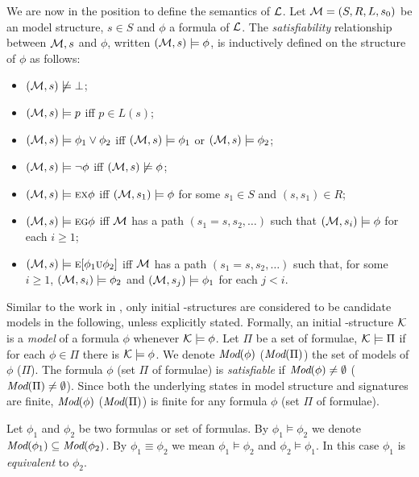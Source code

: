 \documentclass{article}
\begin{document}
We are now in the position to define the semantics of $\cal L$.
Let ${\cal M}=(S,R,L,s_0)$ be an model structure, $s\in S$ and $\phi$ a formula of $\cal L$.
The {\em satisfiability} relationship between ${\cal M},s$ and $\phi$,
written $({\cal M},s)\models\phi$, is inductively defined on the structure of $\phi$ as follows:
\begin{itemize}
  \item $({\cal M},s)\not\models\bot$;
  \item $({\cal M},s)\models p$ iff $p\in L(s)$;
  \item $({\cal M},s)\models \phi_1\lor\phi_2$ iff
    $({\cal M},s)\models \phi_1$ or $({\cal M},s)\models \phi_2$;
  \item $({\cal M},s)\models \neg\phi$ iff  $({\cal M},s)\not\models\phi$;
  \item $({\cal M},s)\models \textsc{e}\textsc{x}\phi$ iff
    $({\cal M},s_1)\models\phi$ for some $s_1\in S$ and $(s,s_1)\in R$;
  \item $({\cal M},s)\models \textsc{e}\textsc{g}\phi$ iff
    $\cal M$ has a path $(s_1=s,s_2,\ldots)$ such that
    $({\cal M},s_i)\models\phi$ for each $i\ge 1$;
  \item $({\cal M},s)\models \textsc{e}[\phi_1\textsc{u}\phi_2]$ iff
    $\cal M$ has a path $(s_1=s,s_2,\ldots)$ such that, for some $i\ge 1$,
    $({\cal M},s_i)\models\phi_2$ and
    $({\cal M},s_j)\models\phi_1$ for each $j<i$.
\end{itemize}

Similar to the work in \cite{DBLP:journals/tcs/BrowneCG88,Bolotov:1999:JETAI},
only initial \MPK-structures are considered to be candidate models
in the following, unless explicitly stated. Formally,
an initial \MPK-structure $\cal K$ is a {\em model} of a formula $\phi$
whenever ${\cal K}\models\phi$.
Let $\Pi$ be a set of formulae, ${\cal K} \models \Pi$ if for each $\phi\in \Pi$ there is $\cal K \models \phi$.
We denote $\textit{Mod}(\phi)$  ($\textit{Mod}(\Pi)$) the set of models of $\phi$ ($\Pi$).
The formula $\phi$ (set $\Pi$ of formulae) is {\em satisfiable}
if $\textit{Mod}(\phi)\neq\emptyset$ ($\textit{Mod}(\Pi)\neq\emptyset$).
Since both the underlying states in model structure and signatures are finite, $\textit{Mod}(\phi)$ ($\textit{Mod}(\Pi)$)
is finite for any formula $\phi$ (set $\Pi$ of formulae).

Let $\phi_1$ and $\phi_2$ be two formulas or set of formulas.
By $\phi_1\models\phi_2$ we denote $\textit{Mod}(\phi_1)\subseteq\textit{Mod}(\phi_2)$.
By $\phi_1\equiv\phi_2$ we mean $\phi_1\models\phi_2$ and $\phi_2\models\phi_1$.
In this case $\phi_1$ is {\em equivalent} to $\phi_2$.
\end{document}
